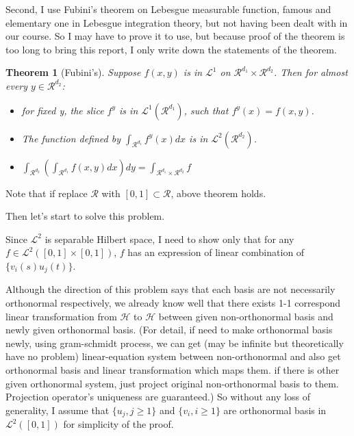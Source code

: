 \documentclass{article}
\newtheorem*{theorem}{Theorem}
\begin{document}
Second, I use Fubini's theorem on Lebesgue measurable function, famous and elementary one in Lebesgue integration theory,
but not having been dealt with in our course. So I may have to prove it to use, 
but because proof of the theorem is too long to bring this report,
I only write down the statements of the theorem.

\begin{theorem}[Fubini's]
    Suppose $f(x,y)$ is in $\mathcal{L}^1$ on $\mathcal{R}^{d_1}\times \mathcal{R}^{d_2}$.
    Then for almost every $y \in \mathcal{R}^{d_2}$:
    \begin{itemize}
        \item for fixed y, the slice $f^y$ is in $\mathcal{L}^1(\mathcal{R}^{d_1})$, such that $f^y(x)=f(x,y)$.
        \item The function defined by $\int_{\mathcal{R}^{d_1}}f^y(x)dx$ is in $\mathcal{L}^2(\mathcal{R}^{d_2})$.
        \item $\int_{\mathcal{R}^{d_2}}(\int_{\mathcal{R}^{d_1}}f(x,y)dx)dy=\int_{\mathcal{R}^{d_1}\times \mathcal{R}^{d_2}}f$
    \end{itemize}
\end{theorem}
Note that if replace $\mathcal{R}$ with $[0,1]\subset\mathcal{R}$, above theorem holds.

Then let's start to solve this problem.

Since $\mathcal{L}^2$ is separable Hilbert space, I need to show only that for any $f\in \mathcal{L}^2([0,1]\times[0,1])$,
$f$ has an expression of linear combination of $\{v_i(s)u_j(t)\}$.

Although the direction of this problem says that each basis are not necessarily orthonormal respectively, 
we already know well that there exists 1-1 correspond linear transformation from $\mathcal{H}$ to $\mathcal{H}$ between
given non-orthonormal basis and newly given orthonormal basis. 
(For detail, if need to make orthonormal basis newly, using gram-schmidt process, we can get (may be infinite but theoretically have no problem)
linear-equation system between non-orthonormal and also get orthonormal basis and linear transformation which maps them.
if there is other given orthonormal system, just project original non-orthonormal basis to them. Projection operator's uniqueness are guaranteed.)
So without any loss of generality, I assume that $\{u_j, j\geq 1\}$ and $\{v_i, i\geq 1\}$ are
orthonormal basis in $\mathcal{L}^2([0,1])$ for simplicity of the proof.
\end{document}
